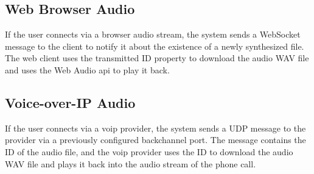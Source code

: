 \subsection{Web Browser Audio}

If the user connects via a browser audio stream, the system sends a WebSocket message to the client to notify it about 
the existence of a newly synthesized file. The web client uses the transmitted ID property to download the audio WAV 
file and uses the Web Audio \ac{api} to play it back.

\subsection{Voice-over-IP Audio}

If the user connects via a \ac{voip} provider, the system sends a UDP message to the provider via a previously 
configured backchannel port. The message contains the ID of the audio file, and the \ac{voip} provider uses the ID to 
download the audio WAV file and plays it back into the audio stream of the phone call.
